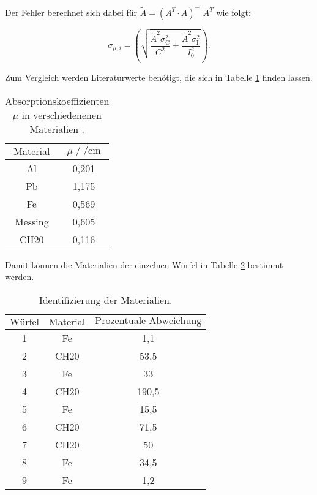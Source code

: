 Der Fehler berechnet sich dabei für $\tilde{A} = \left(A^T \cdot A\right)^{-1}A^T$ wie folgt:

\begin{equation*}
  \sigma_{\mu,i} = \left(\sqrt{\frac{\tilde{A}^2\sigma_\text{C}^2}{C^2}+\frac{\tilde{A}^2\sigma_\text{I}^2}{I_0^2}}\right).
\end{equation*}

Zum Vergleich werden Literaturwerte benötigt, die sich in Tabelle \ref{tab:lit} finden lassen. 

\begin{table}[H]
  \centering
  \caption{Absorptionskoeffizienten $\mu$ in verschiedenenen Materialien \cite{lit}.}
  \label{tab:lit}
  \begin{tabular}{c c}
  \toprule
  $\text{Material}$ & $\mu \;/\; \si{\per\centi\metre}$\\
  \midrule
      Al & 0,201\\
      Pb & 1,175\\
      Fe & 0,569\\
      Messing & 0,605\\
      CH20  & 0,116\\
  \bottomrule
  \end{tabular}
\end{table}

Damit können die Materialien der einzelnen Würfel in Tabelle \ref{tab:mat} bestimmt werden. 

\begin{table}[H]
  \centering
  \caption{Identifizierung der Materialien.}
  \label{tab:mat}
  \begin{tabular}{c c c}
  \toprule
  $\text{Würfel}$ & $\text{Material}$ & $\text{Prozentuale Abweichung}$\\
  \midrule
    1 & Fe & 1,1\\
    2 & CH20 & 53,5\\
    3 & Fe & 33\\
    4 & CH20 & 190,5\\
    5 & Fe & 15,5\\
    6 & CH20 & 71,5\\
    7 & CH20 & 50\\
    8 & Fe & 34,5 \\
    9 & Fe & 1,2\\
  \bottomrule
  \end{tabular}
\end{table}